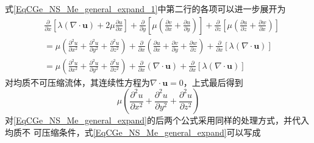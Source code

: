式\eqref{EqCGe_NS_Me_general_expand_1}中第二行的各项可以进一步展开为
\begin{equation}
  \begin{aligned}
    &\frac{\partial }{\partial x}
    \left[
      \lambda(\nabla\cdot\mathbf{u}) + 2\mu\frac{\partial u}{\partial x}
    \right]
    +\frac{\partial }{\partial y}
    \left[
      \mu
      \left(
      \frac{\partial v}{\partial x}+\frac{\partial u}{\partial y}
      \right)
    \right]
    +\frac{\partial }{\partial z}
    \left[
      \mu
      \left(
      \frac{\partial u}{\partial z}+\frac{\partial w}{\partial x}
      \right)
    \right]
    \\
    &=
    \mu
    \left(
    \frac{\partial^{2} u}{\partial x^{2}} +
    \frac{\partial^{2} u}{\partial y^{2}} +
    \frac{\partial^{2} u}{\partial z^{2}}
    \right)
    +
    \frac{\partial}{\partial x}
    \left(
    \frac{\partial u}{\partial x} +
    \frac{\partial v}{\partial y} +
    \frac{\partial w}{\partial z}
    \right)
    +
    \frac{\partial}{\partial x}[\lambda(\nabla\cdot\mathbf{u})]
    \\
    &=
    \mu
    \left(
    \frac{\partial^{2} u}{\partial x^{2}} +
    \frac{\partial^{2} u}{\partial y^{2}} +
    \frac{\partial^{2} u}{\partial z^{2}}
    \right)
    +
    \frac{\partial}{\partial x}
    \left(
    \nabla\cdot\mathbf{u}
    \right)
    +
    \frac{\partial}{\partial x}[\lambda(\nabla\cdot\mathbf{u})]
  \end{aligned}
\end{equation}
对均质不可压缩流体，其连续性方程为$\nabla\cdot\mathbf{u}=0$，上式最后得到
\begin{equation}
  \mu
  \left(
  \frac{\partial^{2} u}{\partial x^{2}} +
  \frac{\partial^{2} u}{\partial y^{2}} +
  \frac{\partial^{2} u}{\partial z^{2}}
  \right)
\end{equation}
对\eqref{EqCGe_NS_Me_general_expand}的后两个公式采用同样的处理方式，并代入均质不
可压缩条件，式\eqref{EqCGe_NS_Me_general_expand}可以写成
